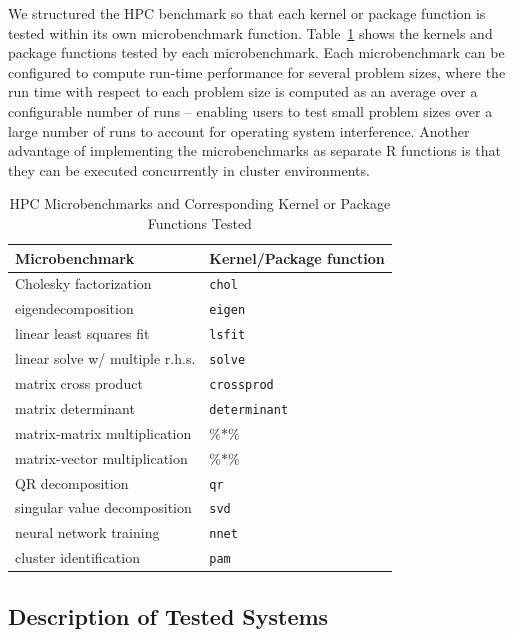 We structured the HPC benchmark so that each kernel or package function is tested within
its own microbenchmark function. Table~\ref{tab:microbenchmarks} shows the kernels and
package functions tested by each microbenchmark. Each microbenchmark can be configured to
compute run-time performance for several problem sizes, where the run time with respect to
each problem size is computed as an average over a configurable number of runs -- enabling
users to test small problem sizes over a large number of runs to account for operating
system interference. Another advantage of implementing the microbenchmarks as separate R
functions is that they can be executed concurrently in cluster environments.

\begin{table}
  \caption{HPC Microbenchmarks and Corresponding Kernel or Package Functions Tested}
  \label{tab:microbenchmarks}
  \begin{tabular}{ll}
    \toprule
    Microbenchmark & Kernel/Package function \\
    \midrule
    Cholesky factorization       & \texttt{chol} \\
    eigendecomposition           & \texttt{eigen} \\
    linear least squares fit     & \texttt{lsfit} \\
    linear solve w/ multiple r.h.s. & \texttt{solve} \\
    matrix cross product         & \texttt{crossprod} \\
    matrix determinant           & \texttt{determinant} \\
    matrix-matrix multiplication & $\%$$*$$\%$ \\
    matrix-vector multiplication & $\%$$*$$\%$ \\
    QR decomposition             & \texttt{qr} \\
    singular value decomposition & \texttt{svd} \\
    neural network training      & \texttt{nnet} \\
    cluster identification       & \texttt{pam} \\
    \bottomrule
  \end{tabular}
\end{table}

\subsection{Description of Tested Systems}


